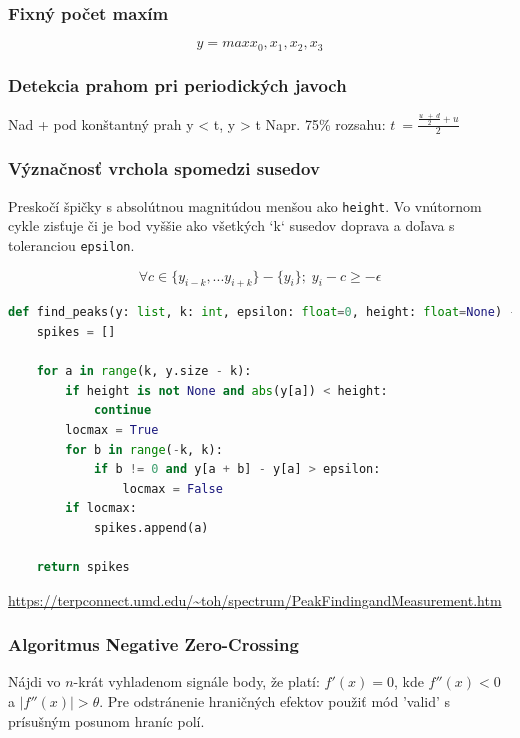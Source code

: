 \cite{spectrometry-peak-detection}
\cite{survey-peaks-valleys}
\cite{ecg-r-peak-detection}
\cite{ampd-algorithm}

\subsubsection{Fixný počet maxím}
$$ y = max{x_0, x_1, x_2, x_3}$$


\subsubsection{Detekcia prahom pri periodických javoch}
Nad + pod konštantný prah y < t, y > t
Napr. 75\% rozsahu: $t\ =\frac{\frac{u\ \ +\ d}{2}+u}{2}$

\subsubsection{Význačnosť vrchola spomedzi susedov}
Preskočí špičky s absolútnou magnitúdou menšou ako \verb|height|. Vo vnútornom cykle zisťuje či je bod vyššie ako všetkých `k` susedov doprava a doľava s toleranciou \verb|epsilon|.

\begin{equation}
\forall c \in \{y_{i-k}, ... y_{i+k}\} - \{y_i\}; \; y_i - c \geq -\epsilon
\end{equation}

\begin{lstlisting}[language=Python]
def find_peaks(y: list, k: int, epsilon: float=0, height: float=None) -> list:
    spikes = []

    for a in range(k, y.size - k):
        if height is not None and abs(y[a]) < height:
            continue
        locmax = True
        for b in range(-k, k):
            if b != 0 and y[a + b] - y[a] > epsilon:
                locmax = False
        if locmax:
            spikes.append(a)

    return spikes
\end{lstlisting}
\url{https://terpconnect.umd.edu/~toh/spectrum/PeakFindingandMeasurement.htm}

\subsubsection{Algoritmus Negative Zero-Crossing}
Nájdi vo $n$-krát vyhladenom signále body, že platí: $f'(x) = 0$, kde $f''(x) < 0$ a $|f''(x)| > \theta$. Pre odstránenie hraničných efektov použiť mód 'valid' s prísušným posunom hraníc polí.

